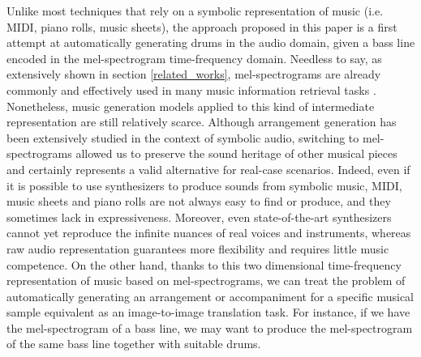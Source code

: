 \documentclass[journal]{IEEEtran}
\begin{document}
Unlike most techniques that rely on a symbolic representation of music (i.e. MIDI, piano rolls, music sheets), the approach proposed in this paper is a first attempt at automatically generating drums in the audio domain, given a bass line encoded in the mel-spectrogram time-frequency domain. Needless to say, as extensively shown in section \ref{related_works}, mel-spectrograms are already commonly and effectively used in many music information retrieval tasks \cite{4895319}. Nonetheless, music generation models applied to this kind of intermediate representation are still relatively scarce. Although arrangement generation has been extensively studied in the context of symbolic audio, switching to mel-spectrograms allowed us to preserve the sound heritage of other musical pieces and certainly represents a valid alternative for real-case scenarios. Indeed, even if it is possible to use synthesizers to produce sounds from symbolic music, MIDI, music sheets and piano rolls are not always easy to find or produce, and they sometimes lack in expressiveness. Moreover, even state-of-the-art synthesizers cannot yet reproduce the infinite nuances of real voices and instruments, whereas raw audio representation guarantees more flexibility and requires little music competence.
On the other hand, thanks to this two dimensional time-frequency representation of music based on mel-spectrograms, we can treat the problem of automatically generating an arrangement or accompaniment for a specific musical sample equivalent as an image-to-image translation task. For instance, if we have the mel-spectrogram of a bass line, we may want to produce the mel-spectrogram of the same bass line together with suitable drums. 
\end{document}
